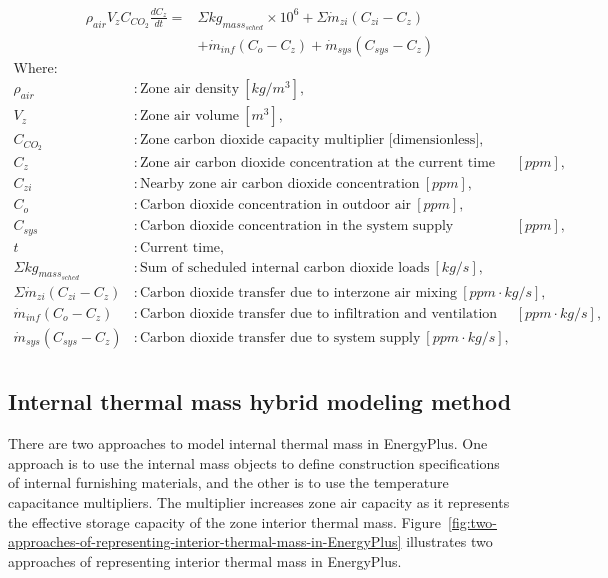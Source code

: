 \documentclass[11pt]{article}
\begin{document}
\begin{equation}
\begin{aligned}
\rho_{air} V_{z} C_{CO_{2}}\frac {dC_z} {dt} = &\Sigma{kg_{mass_{sched}}}\times 10^{6} + \Sigma{\dot{m}_{zi}(C_{zi}-C_z)} \\
& + \dot{m}_{inf} (C_o - C_z) + \dot{m}_{sys} (C_{sys} - C_z)
\end{aligned}
\end{equation}
\begin{align*}
\text{Where: }\\
  \rho_{air} &: \text{Zone air density} ~ [kg/m^{3}], \\
  V_{z} &: \text{Zone air volume} ~ [m^{3}],\\
  C_{CO_{2}} &: \text{Zone carbon dioxide capacity multiplier [dimensionless]},\\
  C_{z} &: \text{Zone air carbon dioxide concentration at the current time step} ~ [ppm],\\
  C_{zi} &: \text{Nearby zone air carbon dioxide concentration} ~ [ppm],\\
  C_o&: \text{Carbon dioxide concentration in outdoor air} ~ [ppm],\\
  C_{sys}&: \text{Carbon dioxide concentration in the system supply airstream}~ [ppm],\\
  t &: \text{Current time},\\
  \Sigma{kg_{mass_{sched}}} &: \text{Sum of scheduled internal carbon dioxide loads} ~ [kg/s],\\
  \Sigma{\dot{m}_{zi}(C_{zi}-C_z)} &: \text{Carbon dioxide transfer due to interzone air mixing} ~ [ppm \cdot kg/s],\\
  \dot{m}_{inf} (C_o - C_z)&: \text{Carbon dioxide transfer due to infiltration and ventilation of outdoor air} ~ [ppm \cdot kg/
s],\\
  \dot{m}_{sys} (C_{sys} - C_z)&: \text{Carbon dioxide transfer due to system supply} ~ [ppm \cdot kg/s],\\
\end{align*}


\subsection{Internal thermal mass hybrid modeling method}\label{internal-thermal-mass-hybrid-modeling method}
There are two approaches to model internal thermal mass in EnergyPlus. One approach is to use the internal mass objects to define construction specifications of internal furnishing materials, and the other is to use the temperature capacitance multipliers. The multiplier increases zone air capacity as it represents the effective storage capacity of the zone interior thermal mass. Figure~\ref {fig:two-approaches-of-representing-interior-thermal-mass-in-EnergyPlus} illustrates two approaches of representing interior thermal mass in EnergyPlus.
\end{document}
